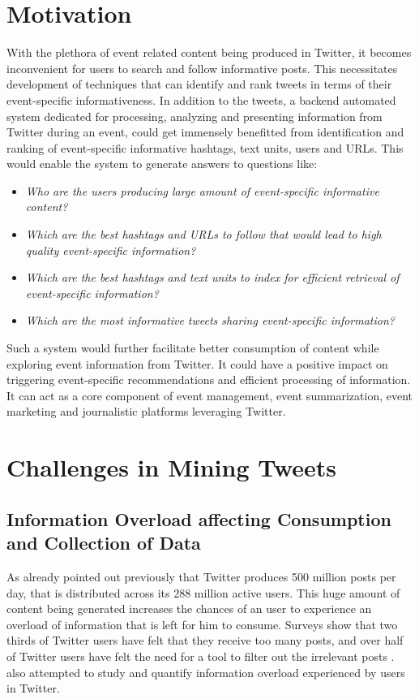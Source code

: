 \section{Motivation} 
With the plethora of event related content being produced in Twitter, it becomes inconvenient for users to search and follow informative posts. This necessitates development of techniques that can identify and rank tweets in terms of their event-specific informativeness. In addition to the tweets, a backend automated system dedicated for processing, analyzing and presenting information from Twitter during an event, could get immensely benefitted from identification and ranking of event-specific informative hashtags, text units, users and URLs. This would enable the system to generate answers to questions like:
\begin{itemize}
\item \textit{Who are the users producing large amount of event-specific informative content?}
\item \textit{Which are the best hashtags and URLs to follow that would lead to high quality event-specific information?}
\item \textit{Which are the best hashtags and text units to index for efficient retrieval of event-specific information?}
\item \textit{Which are the most informative tweets sharing event-specific information?}
\end{itemize}
Such a system would further facilitate better consumption of content while exploring event information from Twitter. It could have a positive impact on triggering event-specific recommendations and efficient processing of information. It can act as a core component of event management, event summarization, event marketing and journalistic platforms leveraging Twitter.


\section{Challenges in Mining Tweets} 
\subsection{Information Overload affecting Consumption and Collection of Data}
As already pointed out previously that Twitter produces 500 million posts per day, that is distributed across its 288 million active users. This huge amount of content being generated increases the chances of an user to experience an overload of information that is left for him to consume. Surveys show that two thirds of Twitter users have felt that they receive too many posts, and over half of Twitter users have felt the need for a tool to filter out the irrelevant posts \cite{bontcheva2013social}. \cite{rodriguez2014quantifying} also attempted to study and quantify information overload experienced by users in Twitter.

